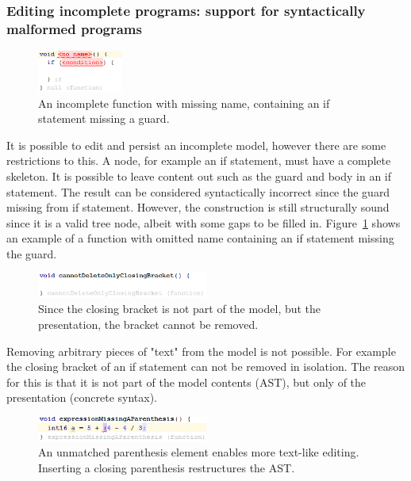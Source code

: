 \documentclass[preprint,numbers,10pt]{sigplanconf}
\begin{document}
\subsubsection{Editing incomplete programs: support for syntactically malformed programs}
\begin{figure}[H]
	\centering
	\includegraphics[width=0.25\textwidth]{screens/IncompleteNode.png}
	\caption{An incomplete function with missing name, containing an if statement missing a guard.}
	\label{fig:IncompleteNode}
\end{figure}

It is possible to edit and persist an incomplete model, however there are some restrictions to this. A node, for example an if statement, must have a complete skeleton. It is possible to leave content out such as the guard and body in an if statement. The result can be considered syntactically incorrect since the guard missing from if statement. However, the construction is still structurally sound since it is a valid tree node, albeit with some gaps to be filled in. Figure~\ref{fig:IncompleteNode} shows an example of a function with omitted name containing an if statement missing the guard. 

\begin{figure}[H]
	\centering
	\includegraphics[width=0.50\textwidth]{screens/CannotDeleteConcreteSyntaxElements.png}
	\caption{Since the closing bracket is not part of the model, but the presentation, the bracket cannot be removed.}
	\label{fig:CannotDeleteConcreteSyntaxElements}
\end{figure}
Removing arbitrary pieces of "text" from the model is not possible. For example the closing bracket of an if statement can not be removed in isolation. The reason for this is that it is not part of the model contents (AST), but only of the presentation (concrete syntax).

\begin{figure}[H]
	\centering
	\includegraphics[width=0.5\textwidth]{screens/UnmatchedParenthesis.png}
	\caption{An unmatched parenthesis element enables more text-like editing. Inserting a closing parenthesis restructures the AST.}
	\label{fig:UnmatchedParenthesis}
\end{figure}
\end{document}
